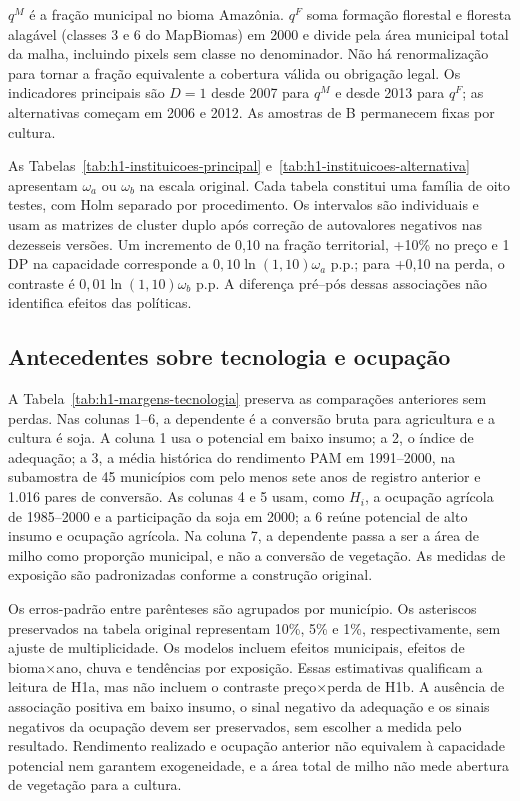 $q^M$ é a fração municipal no bioma Amazônia. $q^F$ soma formação florestal e floresta alagável (classes 3 e 6 do MapBiomas) em 2000 e divide pela área municipal total da malha, incluindo pixels sem classe no denominador. Não há renormalização para tornar a fração equivalente a cobertura válida ou obrigação legal. Os indicadores principais são $D=1$ desde 2007 para $q^M$ e desde 2013 para $q^F$; as alternativas começam em 2006 e 2012. As amostras de B permanecem fixas por cultura.

As Tabelas~\ref{tab:h1-instituicoes-principal} e~\ref{tab:h1-instituicoes-alternativa} apresentam $\omega_a$ ou $\omega_b$ na escala original. Cada tabela constitui uma família de oito testes, com Holm separado por procedimento. Os intervalos são individuais e usam as matrizes de cluster duplo após correção de autovalores negativos nas dezesseis versões. Um incremento de 0,10 na fração territorial, +10\% no preço e 1 DP na capacidade corresponde a $0{,}10\ln(1{,}10)\omega_a$ p.p.; para +0,10 na perda, o contraste é $0{,}01\ln(1{,}10)\omega_b$ p.p. A diferença pré--pós dessas associações não identifica efeitos das políticas.


\FloatBarrier

\FloatBarrier

\subsection{Antecedentes sobre tecnologia e ocupação}
\label{ap:antecedentes}

A Tabela~\ref{tab:h1-margens-tecnologia} preserva as comparações anteriores sem perdas. Nas colunas 1--6, a dependente é a conversão bruta para agricultura e a cultura é soja. A coluna 1 usa o potencial em baixo insumo; a 2, o índice de adequação; a 3, a média histórica do rendimento PAM em 1991--2000, na subamostra de 45 municípios com pelo menos sete anos de registro anterior e 1.016 pares de conversão. As colunas 4 e 5 usam, como $H_i$, a ocupação agrícola de 1985--2000 e a participação da soja em 2000; a 6 reúne potencial de alto insumo e ocupação agrícola. Na coluna 7, a dependente passa a ser a área de milho como proporção municipal, e não a conversão de vegetação. As medidas de exposição são padronizadas conforme a construção original.

Os erros-padrão entre parênteses são agrupados por município. Os asteriscos preservados na tabela original representam 10\%, 5\% e 1\%, respectivamente, sem ajuste de multiplicidade. Os modelos incluem efeitos municipais, efeitos de bioma×ano, chuva e tendências por exposição. Essas estimativas qualificam a leitura de H1a, mas não incluem o contraste preço×perda de H1b. A ausência de associação positiva em baixo insumo, o sinal negativo da adequação e os sinais negativos da ocupação devem ser preservados, sem escolher a medida pelo resultado. Rendimento realizado e ocupação anterior não equivalem à capacidade potencial nem garantem exogeneidade, e a área total de milho não mede abertura de vegetação para a cultura.


\FloatBarrier
